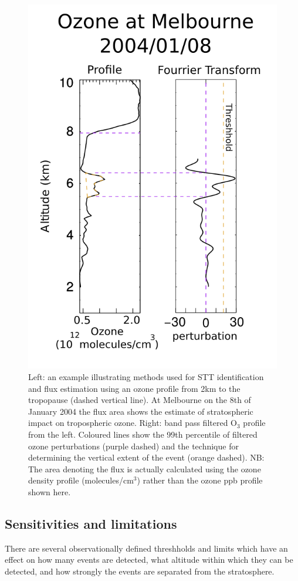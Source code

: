 \documentclass{article}
\begin{document}
    \begin{figure}[!htbp]
      \begin{center}
      \includegraphics[width=0.8\columnwidth]{figures/filtereg.png}
      \caption{ Left: an example illustrating methods used for STT identification and flux estimation using an ozone profile from 2km to the tropopause (dashed vertical line).
      At Melbourne on the 8th of January 2004 the flux area shows the estimate of stratospheric impact on tropospheric ozone.
      Right: band pass filtered O$_3$ profile from the left.
      Coloured lines show the 99th percentile of filtered ozone perturbations (purple dashed) and the technique for determining the vertical extent of the event (orange dashed).
      NB: The area denoting the flux is actually calculated using the ozone density profile (molecules/cm$^3$) rather than the ozone ppb profile shown here.
      }
      \label{fig:filterEG}
      \end{center}
    \end{figure}

  \subsection{Sensitivities and limitations}
    There are several observationally defined threshholds and limits which have an effect on how many events are detected, what altitude within which they can be detected, and how strongly the events are separated from the stratosphere.
    
\end{document}
